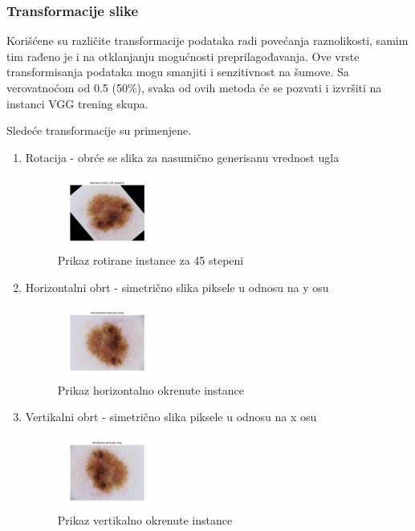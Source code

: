 \documentclass{article}
\begin{document}
\subsubsection{Transformacije slike}
Korišćene su različite transformacije podataka radi povećanja raznolikosti, samim tim rađeno je i na otklanjanju mogućnosti preprilagođavanja. Ove vrste transformisanja podataka mogu smanjiti i senzitivnost na šumove. Sa verovatnoćom od 0.5 (50\%), svaka od ovih metoda će se pozvati i izvršiti na instanci VGG trening skupa.
\par
Sledeće transformacije su primenjene.

\begin{enumerate}
    \item Rotacija - obrće se slika za nasumično generisanu vrednost ugla
    \begin{figure}[H]
        \centering
        \includegraphics[width=0.3\textwidth]{slike_raka/rotated_image.png} 
        \caption{Prikaz rotirane instance za 45 stepeni} 
        \label{rotacija}
    \end{figure}
    \item Horizontalni obrt - simetrično slika piksele u odnosu na y osu
    \begin{figure}[H]
        \centering
        \includegraphics[width=0.3\textwidth]{slike_raka/horizontal_flip_image.png} 
        \caption{Prikaz horizontalno okrenute instance} 
        \label{horizontalno okrenuta instanca}
    \end{figure}
    \item Vertikalni obrt - simetrično slika piksele u odnosu na x osu
    \begin{figure}[H]
        \centering
        \includegraphics[width=0.3\textwidth]{slike_raka/vertical_flip_image.png} 
        \caption{Prikaz vertikalno okrenute instance} 
        \label{vertikalno okrenuta instanca}
    \end{figure}
\end{enumerate}
\end{document}
